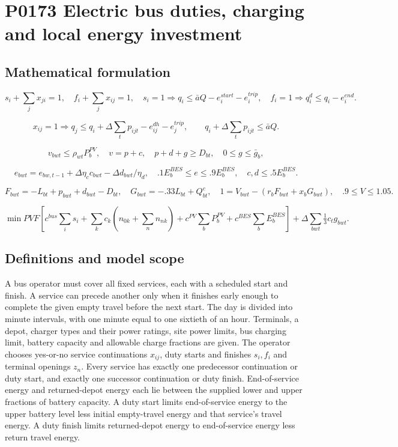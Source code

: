\documentclass[10pt]{article}
\begin{document}
\section*{P0173 Electric bus duties, charging and local energy investment}
\subsection*{Mathematical formulation}
\[
s_i+\sum_jx_{ji}=1,\quad f_i+\sum_jx_{ij}=1,\quad
s_i=1\Rightarrow q_i\le\bar aQ-e_i^{start}-e_i^{trip},
\quad f_i=1\Rightarrow q_i^d\le q_i-e_i^{end}.
\]

\[
x_{ij}=1\Rightarrow
q_j\le q_i+\Delta\sum_tp_{ijt}-e^{dh}_{ij}-e_j^{trip},\qquad
q_i+\Delta\sum_tp_{ijt}\le\bar aQ.
\]

\[
v_{bwt}\le\rho_{wt}P_b^{PV},\quad v=p+c,\quad p+d+g\ge D_{bt},\quad0\le g\le\bar g_b,
\]

\[
e_{bwt}=e_{bw,t-1}+\Delta\eta_c c_{bwt}-\Delta d_{bwt}/\eta_d,\quad
.1E_b^{BES}\le e\le.9E_b^{BES},\quad c,d\le.5E_b^{BES}.
\]

\[
F_{bwt}=-L_{bt}+p_{bwt}+d_{bwt}-D_{bt},\quad
G_{bwt}=-.33L_{bt}+Q^c_{bt},\quad
1=V_{bwt}-(r_bF_{bwt}+x_bG_{bwt}),\quad .9\le V\le1.05.
\]

\[
\min PVF[c^{bus}\sum_is_i+\sum_kc_k(n_{0k}+\sum_nn_{nk})+
c^{PV}\sum_bP_b^{PV}+c^{BES}\sum_bE_b^{BES}]
+\Delta\sum_{bwt}\tfrac13c_tg_{bwt}.
\]

\subsection*{Definitions and model scope}
A bus operator must cover all fixed services, each with a scheduled start and finish. A service can precede another only when it finishes early enough to complete the given empty travel before the next start. The day is divided into minute intervals, with one minute equal to one sixtieth of an hour. Terminals, a depot, charger types and their power ratings, site power limits, bus charging limit, battery capacity and allowable charge fractions are given. The operator chooses yes-or-no service continuations $x_{ij}$, duty starts and finishes $s_i,f_i$ and terminal openings $z_n$. Every service has exactly one predecessor continuation or duty start, and exactly one successor continuation or duty finish. End-of-service energy and returned-depot energy each lie between the supplied lower and upper fractions of battery capacity. A duty start limits end-of-service energy to the upper battery level less initial empty-travel energy and that service's travel energy. A duty finish limits returned-depot energy to end-of-service energy less return travel energy.
\end{document}
